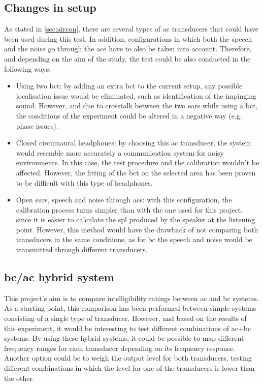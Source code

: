 \subsection*{Changes in setup}
As stated in \autoref{sec:aircon}, there are several types of \gls{ac} transducers that could have been used during this test. In addition, configurations in which both the speech and the noise go through the \gls{ace} have to also be taken into account. Therefore, and depending on the aim of the study, the test could be also conducted in the following ways:
\begin{itemize}
\item Using two \gls{bct}: by adding an extra \gls{bct} to the current setup, any possible localisation issue would be eliminated, such as identification of the impinging sound. However, and due to crosstalk between the two ears while using a \gls{bct}, the conditions of the experiment could be altered in a negative way (e.g. phase issues).
\item Closed circumaural headphones: by choosing this \gls{ac} transducer, the system would resemble more accurately a communication system for noisy environments. In this case, the test procedure and the calibration wouldn't be affected. However, the fitting of the \gls{bct} on the selected area has been proven to be difficult with this type of headphones.
\item Open ears, speech and noise through \gls{acs}: with this configuration, the calibration process turns simpler than with the one used for this project, since it is easier to calculate the \gls{spl} produced by the speaker at the listening point. However, this method would have the drawback of not comparing both transducers in the same conditions, as for \gls{bc} the speech and noise would be transmitted through different transducers.
\end{itemize}

\subsection*{\gls{bc}/\gls{ac} hybrid system}
This project's aim is to compare intelligibility ratings between \gls{ac}
and \gls{bc} systems. As a starting point, this comparison has been performed between simple systems consisting of a single type of transducer. However, and based on the results of this experiment, it would be interesting to test different combinations of \gls{ac}+\gls{bc} systems. By using these hybrid systems, it could be possible to map different frequency ranges for each transducer depending on its frequency response. Another option could be to weigh the output level for both transducers, testing different combinations in which the level for one of the transducers is lower than the other. 

